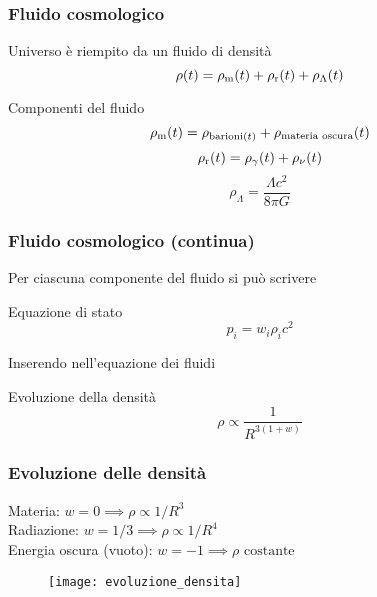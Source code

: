 \begin{frame}
  \frametitle{Fluido cosmologico}
  Universo è riempito da un fluido di densità
  \begin{equation*}
    \rho(t) = \rho_{\textup{m}}(t) + \rho_{\textup{r}}(t) + \rho_\Lambda(t)
  \end{equation*}
  \pause{}
  \begin{block}{Componenti del fluido}
    \begin{equation*}
      \rho_{\textup{m}}(t) = \rho_{\textup{barioni}(t)} + \rho_{\textup{materia
          oscura}}(t)
    \end{equation*}
    \pause{}
    \begin{equation*}
      \rho_{\textup{r}}(t) = \rho_\gamma(t) + \rho_\nu(t)
    \end{equation*}
    \pause{}
    \begin{equation*}
      \rho_\Lambda = \frac{\Lambda c^2}{8\pi G}
    \end{equation*}
  \end{block}
\end{frame}

\begin{frame}
  \frametitle{Fluido cosmologico (continua)}
  Per ciascuna componente del fluido si può scrivere
  \begin{block}{Equazione di stato}
    \begin{equation*}
      p_i = w_i \rho_i c^2
    \end{equation*}
  \end{block}
  \pause{}
  Inserendo nell'equazione dei fluidi
  \begin{block}{Evoluzione della densità}
    \begin{equation*}
      \rho \propto \frac{1}{R^{3(1+w)}}
    \end{equation*}
  \end{block}
\end{frame}

\begin{frame}
  \frametitle{Evoluzione delle densità}
  Materia: $w = 0 \implies \rho \propto 1/R^3$ \\
  Radiazione: $w = 1/3 \implies \rho \propto 1/R^4$ \\
  Energia oscura (vuoto): $w = -1 \implies \rho \text{ costante}$
  \begin{figure}
    \centering
    \texttt{[image: evoluzione\_densita]}
  \end{figure}
\end{frame}


